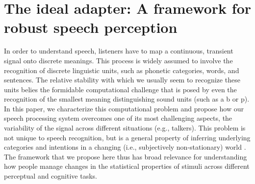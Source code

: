 


\chapter{The ideal adapter: A framework for robust speech perception}\label{chap:ideal-adapter}

In order to understand speech, listeners have to map a continuous, transient signal onto discrete meanings. This process is widely assumed to involve the recognition of discrete linguistic units, such as phonetic categories, words, and sentences. The relative stability with which we usually seem to recognize these units belies the formidable computational challenge that is posed by even the recognition of the smallest meaning distinguishing sound units (such as a \ph b or \ph p). In this paper, we characterize this computational problem and propose how our speech processing system overcomes one of its most challenging aspects, the variability of the signal across different situations (e.g., talkers).
This problem is not unique to speech recognition, but is a general property of inferring underlying categories and intentions in a changing (i.e., subjectively non-stationary) world \cite<see references in>{Qian2012}.
The framework that we propose here thus has broad relevance for understanding how people manage changes in the statistical properties of stimuli across different perceptual and cognitive tasks.

